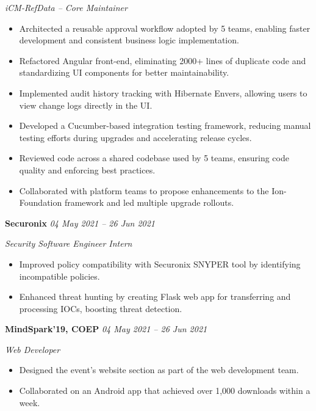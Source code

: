 \documentclass[letterpaper,10pt]{article}
\newcommand{\cvHeaderOne}[1]{%
  \vspace*{1.2em}%
  {\noindent\large\textbf{\MakeUppercase{#1}}\par}%
  \vspace*{0.5em}%
}
\newcommand{\cvHeaderTwo}[2]{%
  \vspace{0.8em}%
  \noindent\textbf{\normalsize #1} \hfill \textit{#2}\par%
}
\newcommand{\cvHeaderThree}[1]{%
  \noindent\textit{#1}%
}
\newcommand{\cvItem}[1]{%
  \noindent\parbox{\dimexpr\linewidth}{#1}\par%
}
\newenvironment{cvItemList}{%
  \begin{itemize}%
    \setlength{\itemsep}{0.1em}%
    \setlength{\topsep}{0em}%
    \setlength{\partopsep}{0em}%
    \setlength{\parsep}{0em}%
    \setlength{\parskip}{0em}%
}{%
  \end{itemize}%
}
\begin{document}
\cvHeaderThree{iCM-RefData – Core Maintainer}
\begin{cvItemList}
  \item Architected a reusable approval workflow adopted by 5 teams, enabling faster development and consistent business logic implementation.
  \item Refactored Angular front-end, eliminating 2000+ lines of duplicate code and standardizing UI components for better maintainability.
  \item Implemented audit history tracking with Hibernate Envers, allowing users to view change logs directly in the UI.
  \item Developed a Cucumber-based integration testing framework, reducing manual testing efforts during upgrades and accelerating release cycles.
  \item Reviewed code across a shared codebase used by 5 teams, ensuring code quality and enforcing best practices.
  \item Collaborated with platform teams to propose enhancements to the Ion-Foundation framework and led multiple upgrade rollouts.
\end{cvItemList}

\cvHeaderTwo{Securonix}{04 May 2021 -- 26 Jun 2021}

\cvHeaderThree{Security Software Engineer Intern}
\begin{cvItemList}
\item Improved policy compatibility with Securonix SNYPER tool by identifying incompatible policies.
\item Enhanced threat hunting by creating Flask web app for transferring and processing IOCs, boosting
threat detection.
\end{cvItemList}

\cvHeaderTwo{MindSpark'19, COEP}{04 May 2021 -- 26 Jun 2021}

\cvHeaderThree{Web Developer}
\begin{cvItemList}
\item Designed the event’s website section as part of the web development team.
\item Collaborated on an Android app that achieved over 1,000 downloads within a week.
\end{cvItemList}

%
%
%
\end{document}
